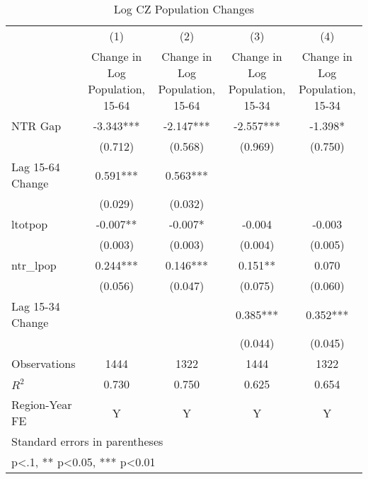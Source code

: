 \begin{table}[htbp]\centering
\def\sym#1{\ifmmode^{#1}\else\(^{#1}\)\fi}
\caption{Log CZ Population Changes}
\begin{tabular}{l*{4}{c}}
\toprule
                    &\multicolumn{1}{c}{(1)}&\multicolumn{1}{c}{(2)}&\multicolumn{1}{c}{(3)}&\multicolumn{1}{c}{(4)}\\
                    &\multicolumn{1}{c}{Change in Log Population, 15-64}&\multicolumn{1}{c}{Change in Log Population, 15-64}&\multicolumn{1}{c}{Change in Log Population, 15-34}&\multicolumn{1}{c}{Change in Log Population, 15-34}\\
\midrule
NTR Gap             &   -3.343***&   -2.147***&   -2.557***&   -1.398*  \\
                    &  (0.712)   &  (0.568)   &  (0.969)   &  (0.750)   \\
\addlinespace
Lag 15-64 Change    &    0.591***&    0.563***&            &            \\
                    &  (0.029)   &  (0.032)   &            &            \\
\addlinespace
ltotpop             &   -0.007** &   -0.007*  &   -0.004   &   -0.003   \\
                    &  (0.003)   &  (0.003)   &  (0.004)   &  (0.005)   \\
\addlinespace
ntr\_lpop            &    0.244***&    0.146***&    0.151** &    0.070   \\
                    &  (0.056)   &  (0.047)   &  (0.075)   &  (0.060)   \\
\addlinespace
Lag 15-34 Change    &            &            &    0.385***&    0.352***\\
                    &            &            &  (0.044)   &  (0.045)   \\
\midrule
Observations        &     1444   &     1322   &     1444   &     1322   \\
\(R^{2}\)           &    0.730   &    0.750   &    0.625   &    0.654   \\
Region-Year FE      &        Y   &        Y   &        Y   &        Y   \\
\bottomrule
\multicolumn{5}{l}{\footnotesize Standard errors in parentheses}\\
\multicolumn{5}{l}{\footnotesize * p<.1, ** p<0.05, *** p<0.01}\\
\end{tabular}
\end{table}

